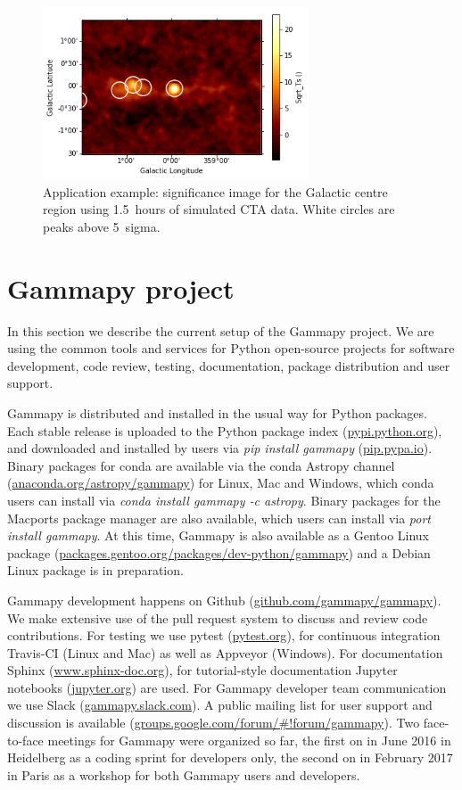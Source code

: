 \documentclass{PoS}
\newcommand{\urlGammapySlack}{\href{https://gammapy.slack.com}{gammapy.slack.com}}
\newcommand{\urlGammapyGithub}{\href{https://github.com/gammapy/gammapy}{github.com/gammapy/gammapy}}
\newcommand{\urlPytest}{\href{https://pytest.org}{pytest.org}}
\newcommand{\urlSphinx}{\href{http://www.sphinx-doc.org}{www.sphinx-doc.org}}
\newcommand{\urlJupyter}{\href{https://jupyter.org}{jupyter.org}}
\newcommand{\urlPypi}{\href{https://pypi.python.org}{pypi.python.org}}
\newcommand{\urlPip}{\href{https://pip.pypa.io}{pip.pypa.io}}
\newcommand{\urlAnacondaGammapy}{\href{https://anaconda.org/astropy/gammapy}{anaconda.org/astropy/gammapy}}
\newcommand{\urlGentooGammapy}{\href{https://packages.gentoo.org/packages/dev-python/gammapy}{packages.gentoo.org/packages/dev-python/gammapy}}
\newcommand{\urlGammapyForum}{\href{https://groups.google.com/forum/\#!forum/gammapy}{groups.google.com/forum/\#!forum/gammapy}}
\begin{document}
\begin{figure}[t]
\centering
\includegraphics[width=0.7\textwidth]{figures/gammapy_example_sky_image.png}
\caption{
Application example: significance image for the Galactic centre region using
1.5~hours of simulated CTA data. White circles are peaks above 5~sigma.
}
\label{fig:app}
\end{figure}

\section{Gammapy project}
\label{sec:project}

In this section we describe the current setup of the Gammapy project. We are using the common tools and services for Python open-source projects for software
development, code review, testing, documentation, package distribution and user
support.

Gammapy is distributed and installed in the usual way for Python packages. Each
stable release is uploaded to the Python package index (\urlPypi), and
downloaded and installed by users via \textit{pip install gammapy} (\urlPip).
Binary packages for conda are available via the conda Astropy channel
(\urlAnacondaGammapy) for Linux, Mac and Windows, which conda users can install
via \textit{conda install gammapy -c astropy}. Binary packages for the Macports
package manager are also available, which users can install via \textit{port
install gammapy}. At this time, Gammapy is also available as a Gentoo Linux
package (\urlGentooGammapy) and a Debian Linux package is in preparation.

Gammapy development happens on Github (\urlGammapyGithub). We make extensive use
of the pull request system to discuss and review code contributions. For testing
we use pytest (\urlPytest), for continuous integration Travis-CI (Linux and Mac)
as well as Appveyor (Windows). For documentation Sphinx (\urlSphinx), for
tutorial-style documentation Jupyter notebooks (\urlJupyter) are used. For
Gammapy developer team communication we use Slack (\urlGammapySlack). A public
mailing list for user support and discussion is available (\urlGammapyForum).
Two face-to-face meetings for Gammapy were organized so far, the first on in
June 2016 in Heidelberg as a coding sprint for developers only, the second on in
February 2017 in Paris as a workshop for both Gammapy users and developers.
\end{document}
